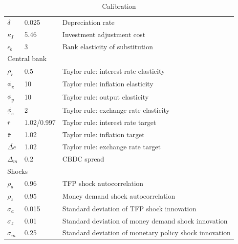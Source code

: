 \documentclass[12pt]{article}
\begin{document}
\begin{table}[h!]
\begin{tabular}{lll}
$\delta$         & 0.025      & Depreciation rate                                                 \\
$\kappa_I$       & 5.46       & Investment adjustment cost                                        \\
$\epsilon_b$     & 3          & Bank elasticity of substitution                                   \\\hline
\multicolumn{3}{l}{Central bank}                                                                     		\\
$\rho_r$         & 0.5        & Taylor rule: interest rate elasticity                                                        \\
$\phi_{\pi}$        & 10         & Taylor rule: inflation elasticity                                                       \\
$\phi_y$         & 10         & Taylor rule: output elasticity                                                      \\
$\phi_e$         & 2          & Taylor rule: exchange rate elasticity                                                       \\
$\bar{r}$         & 1.02/0.997 & Taylor rule: interest rate target                                                      \\
$\bar{\pi}$        & 1.02       & Taylor rule: inflation target                                                       \\
$\overline{\Delta e}$         & 1.02       & Taylor rule: exchange rate target                                               \\
$\Delta_m$       & 0.2        & CBDC spread                                                       \\\hline
\multicolumn{3}{l}{Shocks}                                                                     		\\
$\rho_a$         & 0.96       & TFP shock autocorrelation                                         \\
$\rho_z$         & 0.95       & Money demand shock autocorrelation                                \\
$\sigma_a$      & 0.015      & Standard deviation of TFP shock innovation                        \\
$\sigma_z$      & 0.01       & Standard deviation of money demand shock innovation               \\
$\sigma_m$      & 0.25       & Standard deviation of monetary policy shock innovation         \\\hline  
\end{tabular}
\caption{Calibration}
\end{table}
\end{document}
